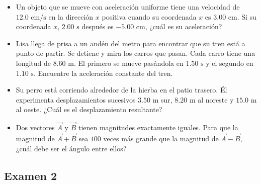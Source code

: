 \documentclass[11pt,a4paper]{article}
\begin{document}
\begin{itemize}
    \item[\textbf{5.}] Un objeto que se mueve con aceleración uniforme tiene una velocidad de $12.0 \text{ cm/s}$ en la dirección $x$ positiva cuando su coordenada $x$ es $3.00 \text{ cm}$. Si su coordenada $x$, $2.00 \text{ s}$ después es $-5.00 \text{ cm}$, ¿cuál es su aceleración?
    \vspace*{6cm}

    \item[\textbf{6.}] Lisa llega de prisa a un andén del metro para encontrar que su tren está a punto de partir. Se detiene y mira los carros que pasan. Cada carro tiene una longitud de $8.60 \text{ m}$. El primero se mueve pasándola en $1.50 \text{ s}$ y el segundo en $1.10 \text{ s}$. Encuentre la aceleración constante del tren.
    \vspace*{6cm}

    \item[\textbf{7.}] Su perro está corriendo alrededor de la hierba en el patio trasero. Él experimenta desplazamientos sucesivos $3.50 \text{ m}$ sur, $8.20 \text{ m}$ al noreste y $15.0 \text{ m}$ al oeste. ¿Cuál es el desplazamiento resultante?
    \vspace*{6cm}

    \item[\textbf{8.}] Dos vectores $\vec{A}$ y $\vec{B}$ tienen magnitudes exactamente iguales. Para que la magnitud de $\vec{A} + \vec{B}$ sea $100$ veces más grande que la magnitud de $\vec{A} - \vec{B}$, ¿cuál debe ser el ángulo entre ellos?
    \vspace*{6cm}
\end{itemize}

\newpage

\subsection*{Examen 2}
\end{document}

